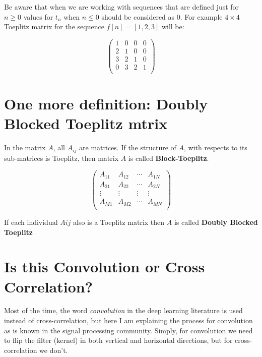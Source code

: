 \documentclass[11pt]{article}
\begin{document}
	Be aware that when we are working with sequences that are defined just for $n \ge 0$ values for $t_n$ when $n \le 0$ should be considered as $0$. For example $4 \times 4$ Toeplitz matrix for the sequence $f[n]=[1,2,3]$ will be:
	
	\begin{equation}
	\begin{pmatrix}
	
	1 & 0 & 0 & 0\\
	2 & 1 & 0 & 0\\
	3 & 2 & 1 & 0\\
	0 & 3 & 2 & 1 \\
	
	\end{pmatrix}
	\end{equation}
	
	\section{One more definition: Doubly Blocked Toeplitz mtrix} \label{doubly_blocked}
	In the matrix $A$, all $A_{ij}$ are matrices. If the structure of $A$, with respects to its sub-matrices is Toeplitz, then matrix $A$ is called \textbf{Block-Toeplitz}. 
	
	\begin{equation}
	\begin{pmatrix}
	A_{11} & A_{12} & \cdots & A_{1N}\\
	A_{21} & A_{22} & \cdots & A_{2N}\\
	\vdots & \vdots & \vdots & \vdots \\
	A_{M1} & A_{M2} & \cdots & A_{MN}\\
	
	\end{pmatrix}
	\end{equation}
	
	If each individual $A{ij}$ also is a Toeplitz matrix then $A$ is called \textbf{Doubly Blocked Toeplitz}
	
	
	\section{Is this Convolution or Cross Correlation?}
	Most of the time, the word \textit{convolution} in the deep learning literature is used instead of cross-correlation, but here I am explaining the process for convolution as is known in the signal processing community. Simply, for convolution we need to flip the filter (kernel) in both vertical and horizontal directions, but for cross-correlation we don't. 
	
\end{document}
